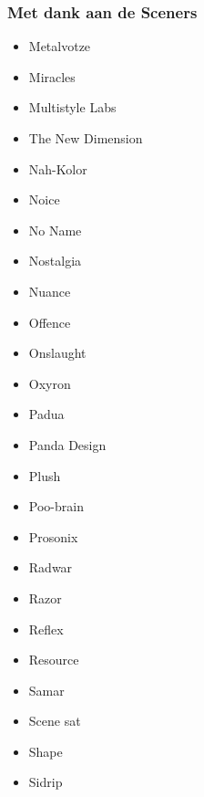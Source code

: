 \begin{frame}[noframenumbering]
\frametitle{Met dank aan de Sceners}

\begin{multicols}{3}
\begin{itemize}
\item Metalvotze
\item Miracles
\item Multistyle Labs
\item The New Dimension
\item Nah-Kolor
\item Noice
\item No Name
\item Nostalgia
\item Nuance
\item Offence
\item Onslaught
\item Oxyron
\item Padua
\item Panda Design
\item Plush
\item Poo-brain
\item Prosonix
\item Radwar
\item Razor
\item Reflex
\item Resource
\item Samar
\item Scene sat
\item Shape
\item Sidrip
\end{itemize}
\end{multicols}

\end{frame}


